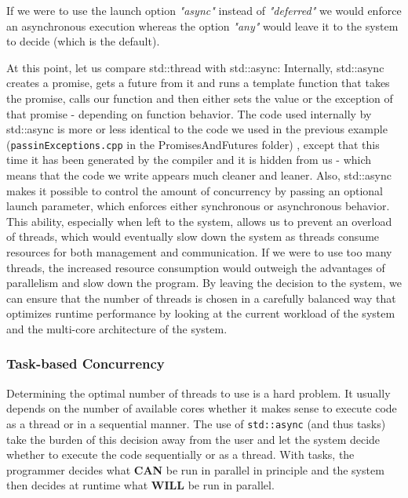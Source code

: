 \documentclass[11pt, a4paper]{article}
\begin{document}
If we were to use the launch option \textit{"async"} instead of \textit{"deferred"} we would enforce an asynchronous execution whereas the option \textit{"any"} would leave it to the system to decide (which is the default).

At this point, let us compare std::thread with std::async: Internally, std::async creates a promise, gets a future from it and runs a template function that takes the promise, calls our function and then either sets the value or the exception of that promise - depending on function behavior. The code used internally by std::async is more or less identical to the code we used in the previous example (\texttt{passinExceptions.cpp} in the PromisesAndFutures folder)  , except that this time it has been generated by the compiler and it is hidden from us - which means that the code we write appears much cleaner and leaner. Also, std::async makes it possible to control the amount of concurrency by passing an optional launch parameter, which enforces either synchronous or asynchronous behavior. This ability, especially when left to the system, allows us to prevent an overload of threads, which would eventually slow down the system as threads consume resources for both management and communication. If we were to use too many threads, the increased resource consumption would outweigh the advantages of parallelism and slow down the program. By leaving the decision to the system, we can ensure that the number of threads is chosen in a carefully balanced way that optimizes runtime performance by looking at the current workload of the system and the multi-core architecture of the system.



\subsubsection{Task-based Concurrency}%
\label{ssub:task_based_concurrency}

Determining the optimal number of threads to use is a hard problem. It usually depends on the number of available cores whether it makes sense to execute code as a thread or in a sequential manner. The use of \texttt{std::async} (and thus tasks) take the burden of this decision away from the user and let the system decide whether to execute the code sequentially or as a thread. With tasks, the programmer decides what \textbf{CAN} be run in parallel in principle and the system then decides at runtime what \textbf{WILL} be run in parallel.
\end{document}
